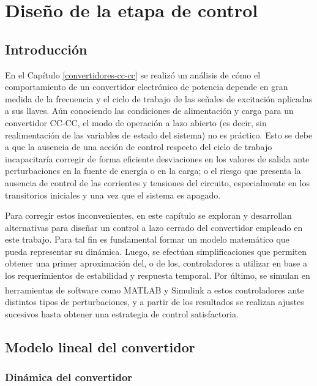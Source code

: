 \chapter{Diseño de la etapa de control}
\label{diseno-control}

\section{Introducción}

En el Capítulo \ref{convertidores-cc-cc} se realizó un análisis de cómo el comportamiento de un convertidor electrónico de potencia depende en gran medida de la frecuencia y el ciclo de trabajo de las señales de excitación aplicadas a sus llaves. Aún conociendo las condiciones de alimentación y carga para un convertidor CC-CC, el modo de operación a lazo abierto (es decir, sin realimentación de las variables de estado del sistema) no es práctico. Esto se debe a que la ausencia de una acción de control respecto del ciclo de trabajo incapacitaría corregir de forma eficiente desviaciones en los valores de salida ante perturbaciones en la fuente de energía o en la carga; o el riesgo que presenta la ausencia de control de las corrientes y tensiones del circuito, especialmente en los transitorios iniciales y una vez que el sistema es apagado.

Para corregir estos inconvenientes, en este capítulo se exploran y desarrollan alternativas para diseñar un control a lazo cerrado del convertidor empleado en este trabajo. Para tal fin es fundamental formar un modelo matemático que pueda representar su dinámica. Luego, se efectúan simplificaciones que permiten obtener una primer aproximación del, o de los, controladores a utilizar en base a los requerimientos de estabilidad y respuesta temporal. Por último, se simulan en herramientas de software como MATLAB\textsuperscript\textregistered \hspace{0.6pt} y Simulink\textsuperscript\textregistered \hspace{0.6pt} a estos controladores ante distintos tipos de perturbaciones, y a partir de los resultados se realizan ajustes sucesivos hasta obtener una estrategia de control satisfactoria.

\section{Modelo lineal del convertidor}

\subsection{Dinámica del convertidor}

